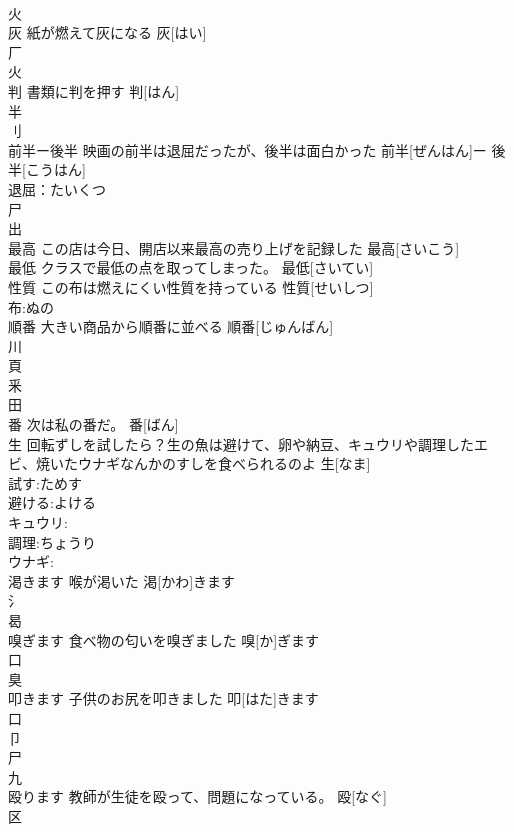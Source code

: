 \documentclass[8pt]{extreport}
\begin{document}
\begin{CJK}{UTF8}{min}
\\	火 
\\	灰	紙が燃えて灰になる	灰[はい]			
\\	厂 
\\	火 
\\	判	書類に判を押す	判[はん]			
\\	半 
\\	刂 
\\	前半ー後半	映画の前半は退屈だったが、後半は面白かった	前半[ぜんはん]ー 後半[こうはん]			
\\	退屈：たいくつ
\\	尸 
\\	出 
\\	最高	この店は今日、開店以来最高の売り上げを記録した	最高[さいこう]			
\\	最低	クラスで最低の点を取ってしまった。	最低[さいてい]			
\\	性質	この布は燃えにくい性質を持っている	性質[せいしつ]			
\\	布:ぬの
\\	順番	大きい商品から順番に並べる	順番[じゅんばん]			
\\	川 
\\	頁 
\\	釆 
\\	田 
\\	番	次は私の番だ。	番[ばん]			
\\	生	回転ずしを試したら？生の魚は避けて、卵や納豆、キュウリや調理したエビ、焼いたウナギなんかのすしを食べられるのよ	生[なま]	
\\	試す:ためす
\\	避ける:よける
\\	キュウリ:
\\	調理:ちょうり
\\	ウナギ:
\\	渇きます	喉が渇いた	渇[かわ]きます			
\\	氵 
\\	曷 
\\	嗅ぎます	食べ物の匂いを嗅ぎました	嗅[か]ぎます			
\\	口 
\\	臭 
\\	叩きます	子供のお尻を叩きました	叩[はた]きます			
\\	口 
\\	卩 
\\	尸 
\\	九 
\\	殴ります	教師が生徒を殴って、問題になっている。	殴[なぐ]			
\\	区 

\end{CJK}
\end{document}
